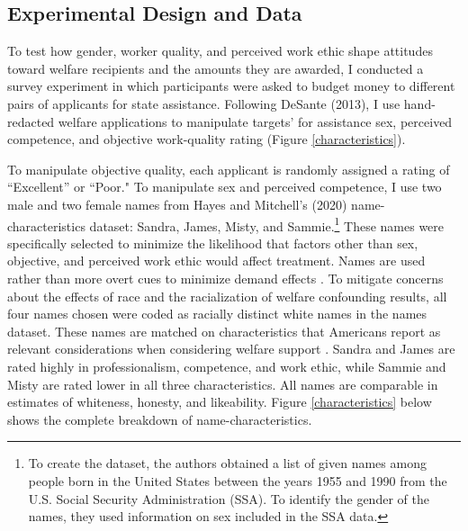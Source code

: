 \documentclass[12pt]{article}%
\begin{document}
\begin{doublespace}
\section*{Experimental Design and Data}
To test how gender, worker quality, and perceived work ethic shape attitudes toward welfare recipients and the amounts they are awarded, I conducted a survey experiment in which participants were asked to budget money to different pairs of applicants for state assistance. Following DeSante (2013), I use hand-redacted welfare applications to manipulate targets’ for assistance sex, perceived competence, and objective work-quality rating (Figure \ref{characteristics}).

To manipulate objective quality, each applicant is randomly assigned a rating of ``Excellent” or ``Poor." To manipulate sex and perceived competence, I use two male and two female names from Hayes and Mitchell’s (2020) name-characteristics dataset: Sandra, James, Misty, and Sammie.\footnote{To create the dataset, the authors obtained a list of given names among people born in the United States between the years 1955 and 1990 from the U.S. Social Security Administration (SSA). To identify the gender of the names, they used information on sex included in the SSA data.} These names were specifically selected to minimize the likelihood that factors other than sex, objective, and perceived work ethic would affect treatment. Names are used rather than more overt cues to minimize demand effects \citep{quidt_experimenter_2019}. To mitigate concerns about the effects of race and the racialization of welfare confounding results, all four names chosen were coded as racially distinct white names in the \cite{hayes_2020} names dataset. These names are matched on characteristics that Americans report as relevant considerations when considering welfare support \citep{bobocel_justice-based_1998, katz_racial_1988, sniderman_symbolic_1986, sniderman_beyond_1996, mclosky_ethos}. Sandra and James are rated highly in professionalism, competence, and work ethic, while Sammie and Misty are rated lower in all three characteristics. All names are comparable in estimates of whiteness, honesty, and likeability. Figure \ref{characteristics} below shows the complete breakdown of name-characteristics.


\end{doublespace}
\end{document}
